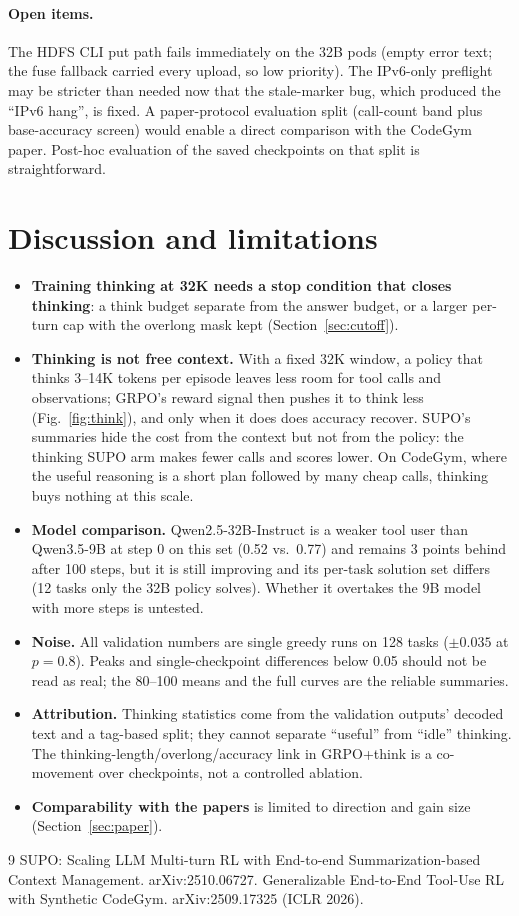 \documentclass[11pt]{article}
\begin{document}
\paragraph{Open items.} The HDFS CLI put path fails immediately on the 32B pods (empty error text; the fuse fallback carried every upload, so low priority). The IPv6-only preflight may be stricter than needed now that the stale-marker bug, which produced the ``IPv6 hang'', is fixed. A paper-protocol evaluation split (call-count band plus base-accuracy screen) would enable a direct comparison with the CodeGym paper. Post-hoc evaluation of the saved checkpoints on that split is straightforward.

\section{Discussion and limitations}
\begin{itemize}[nosep]
\item \textbf{Training thinking at 32K needs a stop condition that closes thinking}: a think budget separate from the answer budget, or a larger per-turn cap with the overlong mask kept (Section~\ref{sec:cutoff}).
\item \textbf{Thinking is not free context.} With a fixed 32K window, a policy that thinks 3--14K tokens per episode leaves less room for tool calls and observations; GRPO's reward signal then pushes it to think less (Fig.~\ref{fig:think}), and only when it does does accuracy recover. SUPO's summaries hide the cost from the context but not from the policy: the thinking SUPO arm makes fewer calls and scores lower. On CodeGym, where the useful reasoning is a short plan followed by many cheap calls, thinking buys nothing at this scale.
\item \textbf{Model comparison.} Qwen2.5-32B-Instruct is a weaker tool user than Qwen3.5-9B at step 0 on this set (0.52 vs.\ 0.77) and remains 3 points behind after 100 steps, but it is still improving and its per-task solution set differs (12 tasks only the 32B policy solves). Whether it overtakes the 9B model with more steps is untested.
\item \textbf{Noise.} All validation numbers are single greedy runs on 128 tasks ($\pm0.035$ at $p=0.8$). Peaks and single-checkpoint differences below 0.05 should not be read as real; the 80--100 means and the full curves are the reliable summaries.
\item \textbf{Attribution.} Thinking statistics come from the validation outputs' decoded text and a tag-based split; they cannot separate ``useful'' from ``idle'' thinking. The thinking-length/overlong/accuracy link in GRPO+think is a co-movement over checkpoints, not a controlled ablation.
\item \textbf{Comparability with the papers} is limited to direction and gain size (Section~\ref{sec:paper}).
\end{itemize}

\begin{thebibliography}{9}
 SUPO: Scaling LLM Multi-turn RL with End-to-end Summarization-based Context Management. arXiv:2510.06727.
 Generalizable End-to-End Tool-Use RL with Synthetic CodeGym. arXiv:2509.17325 (ICLR 2026).
\end{thebibliography}
\end{document}
